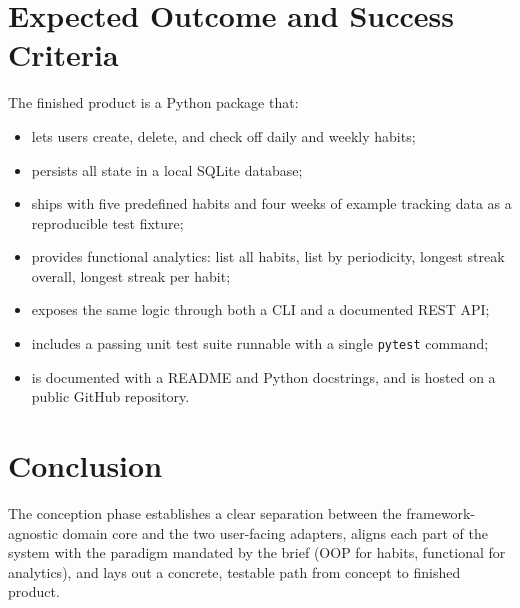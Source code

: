 \documentclass[11pt,a4paper]{article}
\begin{document}
\section{Expected Outcome and Success Criteria}

\noindent


The finished product is a Python package that:

\begin{itemize}
  \item lets users create, delete, and check off daily and weekly habits;
  \item persists all state in a local SQLite database;
  \item ships with five predefined habits and four weeks of example tracking
        data as a reproducible test fixture;
  \item provides functional analytics: list all habits, list by periodicity,
        longest streak overall, longest streak per habit;
  \item exposes the same logic through both a CLI and a documented REST API;
  \item includes a passing unit test suite runnable with a single
        \texttt{pytest} command;
  \item is documented with a README and Python docstrings, and is hosted on a
        public GitHub repository.
\end{itemize}

\medskip
\noindent


\section{Conclusion}

\noindent


The conception phase establishes a clear separation between the
framework-agnostic domain core and the two user-facing adapters, aligns each
part of the system with the paradigm mandated by the brief (OOP for habits,
functional for analytics), and lays out a concrete, testable path from
concept to finished product.

\medskip
\noindent


\end{document}
